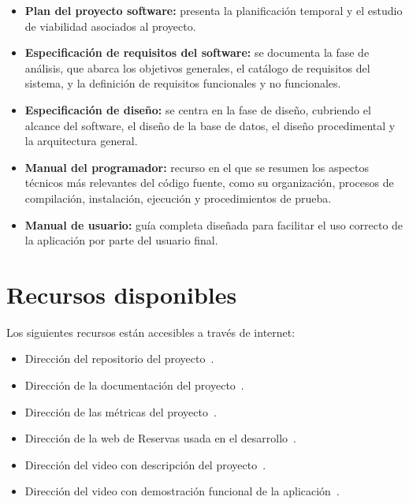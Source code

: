 \begin{itemize}
\tightlist
\item
  \textbf{Plan del proyecto software:} presenta la planificación temporal y el estudio de viabilidad asociados al proyecto.
\item
  \textbf{Especificación de requisitos del software:} se documenta la fase de análisis, que abarca los objetivos generales, el catálogo de requisitos del sistema, y la definición de requisitos funcionales y no funcionales.
\item
  \textbf{Especificación de diseño:} se centra en la fase de diseño, cubriendo el alcance del software, el diseño de la base de datos, el diseño procedimental y la arquitectura general.
\item
  \textbf{Manual del programador:} recurso en el que se resumen los aspectos técnicos más relevantes del código fuente, como su organización, procesos de compilación, instalación, ejecución y procedimientos de prueba.
\item
  \textbf{Manual de usuario:} guía completa diseñada para facilitar el uso correcto de la aplicación por parte del usuario final.
\end{itemize}

\section{Recursos disponibles}\label{materiales-adjuntos}

Los siguientes recursos están accesibles a través de internet: 

\begin{itemize}
\tightlist
\item
	Dirección del repositorio del proyecto~\cite{reservapp:repo}.
\item
	Dirección de la documentación del proyecto~\cite{reservapp:documentacion}.
\item	
	Dirección de las métricas del proyecto~\cite{reservapp:sonarcloud}.
\item	
    Dirección de la web de Reservas usada en el desarrollo~\cite{reservapp:app}.
\item
	Dirección del video con descripción del proyecto~\cite{reservapp:descripcion}.
\item	
	Dirección del video con demostración funcional de la aplicación~\cite{reservapp:demostracion}.
\end{itemize}
